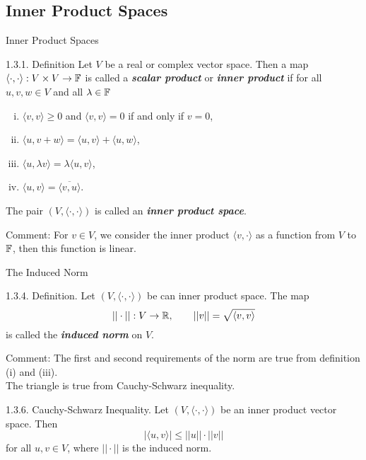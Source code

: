 \documentclass[hyperref={pdfpagelabels=true}]{beamer}
\newcommand{\highlightg}[1]{\textcolor[rgb]{0.1,0.5,0.3}{\emph{\textbf{#1}}}}
\newcommand{\<}{\langle}
\renewcommand{\>}{\rangle}
\begin{document}
\subsection{Inner Product Spaces}
\begin{frame}{Inner Product Spaces}
    \begin{block}{1.3.1. Definition}
        Let $V$ be a real or complex vector space. Then a map $\<\cdot,\cdot\>:V \times V \rightarrow \F$ is called a \highlightg{scalar product} or \highlightg{inner product} if for all $u,v,w \in V$ and all $\lambda \in \mathbb{F}$
        \begin{enumerate}[(i)]
            \item $\<v,v\> \geq 0$ and $\<v,v\> = 0$ if and only if $v = 0$,
            \item $\<u,v+w\> = \<u,v\>+\<u,w\>$,
            \item $\<u,\lambda v\> = \lambda\<u,v\>$,
            \item $\<u,v\> = \overline{\<v,u\>}$. 
        \end{enumerate}
        The pair $(V,\<\cdot,\cdot\>)$ is called an \highlightg{inner product space}.
    \end{block}
    \begin{block}{Comment:}
        For $v \in V$, we consider the inner product $\<v,\cdot\>$ as a function from $V$ to $\mathbb{F}$, then this function is linear.
    \end{block}
\end{frame}
\begin{frame}{The Induced Norm}
    \begin{block}{1.3.4. Definition.}
        Let $(V,\<\cdot,\cdot\>)$ be can inner product space. The map
        \[||\cdot||:V \rightarrow \R, \qquad ||v|| = \sqrt{\<v,v\>}\]
        is called the \highlightg{induced norm} on $V$.
    \end{block}
    \begin{block}{Comment:}
        The first and second requirements of the norm are true from definition (i) and (iii).\\
        The triangle is true from Cauchy-Schwarz inequality.\\
    \end{block}
    \begin{block}{1.3.6. Cauchy-Schwarz Inequality.}
        Let $(V,\<\cdot,\cdot\>)$ be an inner product vector space. Then
        \[|\<u,v\>|\leq||u||\cdot||v|| \]
        for all $u,v \in V$, where $||\cdot||$ is the induced norm. 
    \end{block}
\end{frame}
\end{document}
